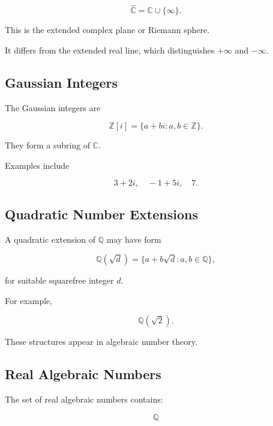 \[
\boxed{
\widehat{\mathbb{C}}
=
\mathbb{C}
\cup
\{\infty\}.
}
\]

This is the extended complex plane or Riemann sphere.

It differs from the extended real line, which distinguishes \(+\infty\) and
\(-\infty\).

\subsection{Gaussian Integers}
\label{subsec:gaussian-integers-reference}

The Gaussian integers are

\[
\boxed{
\mathbb{Z}[i]
=
\{
a+bi
:
a,b\in\mathbb{Z}
\}.
}
\]

They form a subring of \(\mathbb{C}\).

Examples include

\[
\boxed{
3+2i,
\quad
-1+5i,
\quad
7.
}
\]

\subsection{Quadratic Number Extensions}
\label{subsec:quadratic-number-extensions-reference}

A quadratic extension of \(\mathbb{Q}\) may have form

\[
\boxed{
\mathbb{Q}(\sqrt d)
=
\{
a+b\sqrt d
:
a,b\in\mathbb{Q}
\},
}
\]

for suitable squarefree integer \(d\).

For example,

\[
\boxed{
\mathbb{Q}(\sqrt2).
}
\]

These structures appear in algebraic number theory.

\subsection{Real Algebraic Numbers}
\label{subsec:real-algebraic-numbers}

The set of real algebraic numbers contains:

\[
\boxed{
\mathbb{Q}
}
\]


